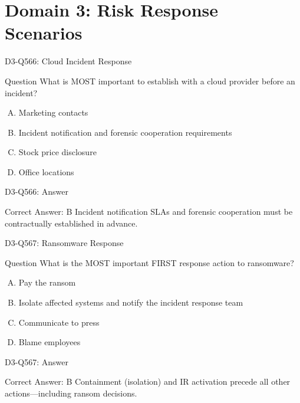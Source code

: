 \documentclass{beamer}
\begin{document}
	\section{Domain 3: Risk Response Scenarios}
	
	\begin{frame}{D3-Q566: Cloud Incident Response}
		\begin{block}{Question}
			What is MOST important to establish with a cloud provider before an incident?
		\end{block}
		\begin{enumerate}[(A)]
			\item Marketing contacts
			\item Incident notification and forensic cooperation requirements
			\item Stock price disclosure
			\item Office locations
		\end{enumerate}
	\end{frame}
	\begin{frame}{D3-Q566: Answer}
		\begin{block}{Correct Answer: B}
			Incident notification SLAs and forensic cooperation must be contractually established in advance.
		\end{block}
	\end{frame}
	
	\begin{frame}{D3-Q567: Ransomware Response}
		\begin{block}{Question}
			What is the MOST important FIRST response action to ransomware?
		\end{block}
		\begin{enumerate}[(A)]
			\item Pay the ransom
			\item Isolate affected systems and notify the incident response team
			\item Communicate to press
			\item Blame employees
		\end{enumerate}
	\end{frame}
	\begin{frame}{D3-Q567: Answer}
		\begin{block}{Correct Answer: B}
			Containment (isolation) and IR activation precede all other actions—including ransom decisions.
		\end{block}
	\end{frame}
	
\end{document}
